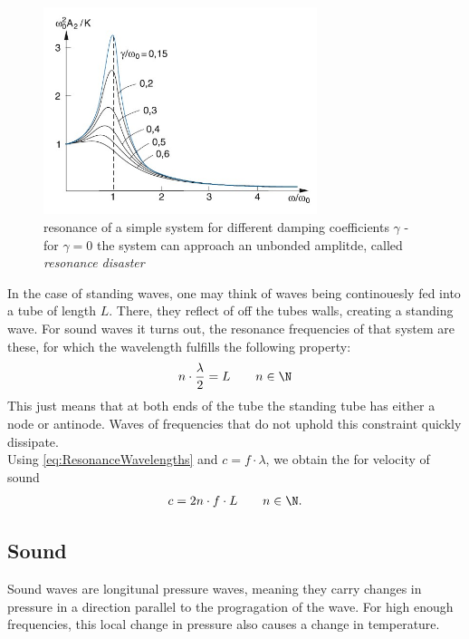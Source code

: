 \documentclass{subfiles}
\begin{document}
            \begin{figure}[H]
                \centering
                \includegraphics[width=8cm]{Bilddateien/Grundlagen/Resonanzkurve.jpg}
                \caption{resonance of a simple system for different damping coefficients $\gamma$ - for $\gamma=0$ the system can approach an unbonded amplitde, called \textit{resonance disaster}}
            \end{figure}
            
            In the case of standing waves, one may think of waves being continouesly fed into a tube of length $L$. There, they reflect of off the tubes walls, creating a standing wave. For sound waves it turns out, the resonance frequencies of that system are these, for which the wavelength fulfills the following property:
            \begin{align}
                n\cdot\frac{\lambda}{2}=L\qquad n\in\N
                \label{eq:ResonanceWavelengths}
            \end{align}
            This just means that at both ends of the tube the standing tube has either a node or antinode. Waves of frequencies that do not uphold this constraint quickly dissipate.\\

            \noindent Using \eqref{eq:ResonanceWavelengths} and $c=f\cdot\lambda$, we obtain the for velocity of sound
            \begin{align*}
                c=2n\cdot f\cdot L\qquad n\in\N.
            \end{align*} 

    \subsection{Sound}
        Sound waves are longitunal pressure waves, meaning they carry changes in pressure in a direction parallel to the progragation of the wave. For high enough frequencies, this local change in pressure also causes a change in temperature.
\end{document}
